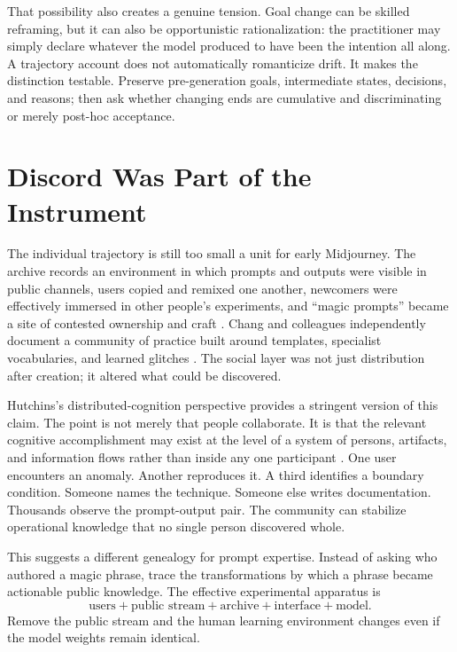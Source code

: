 \documentclass[11pt]{article}
\begin{document}
That possibility also creates a genuine tension. Goal change can be skilled reframing, but it can also be opportunistic rationalization: the practitioner may simply declare whatever the model produced to have been the intention all along. A trajectory account does not automatically romanticize drift. It makes the distinction testable. Preserve pre-generation goals, intermediate states, decisions, and reasons; then ask whether changing ends are cumulative and discriminating or merely post-hoc acceptance.

\section{Discord Was Part of the Instrument}

The individual trajectory is still too small a unit for early Midjourney. The archive records an environment in which prompts and outputs were visible in public channels, users copied and remixed one another, newcomers were effectively immersed in other people's experiments, and ``magic prompts'' became a site of contested ownership and craft \parencite{hartsoe2022midjourneyarchive}. Chang and colleagues independently document a community of practice built around templates, specialist vocabularies, and learned glitches \parencite{chang2023prompt}. The social layer was not just distribution after creation; it altered what could be discovered.

Hutchins's distributed-cognition perspective provides a stringent version of this claim. The point is not merely that people collaborate. It is that the relevant cognitive accomplishment may exist at the level of a system of persons, artifacts, and information flows rather than inside any one participant \parencite{hutchins2006distributed}. One user encounters an anomaly. Another reproduces it. A third identifies a boundary condition. Someone names the technique. Someone else writes documentation. Thousands observe the prompt-output pair. The community can stabilize operational knowledge that no single person discovered whole.

This suggests a different genealogy for prompt expertise. Instead of asking who authored a magic phrase, trace the transformations by which a phrase became actionable public knowledge. The effective experimental apparatus is
\[
\text{users} + \text{public stream} + \text{archive} + \text{interface} + \text{model}.
\]
Remove the public stream and the human learning environment changes even if the model weights remain identical.
\end{document}
